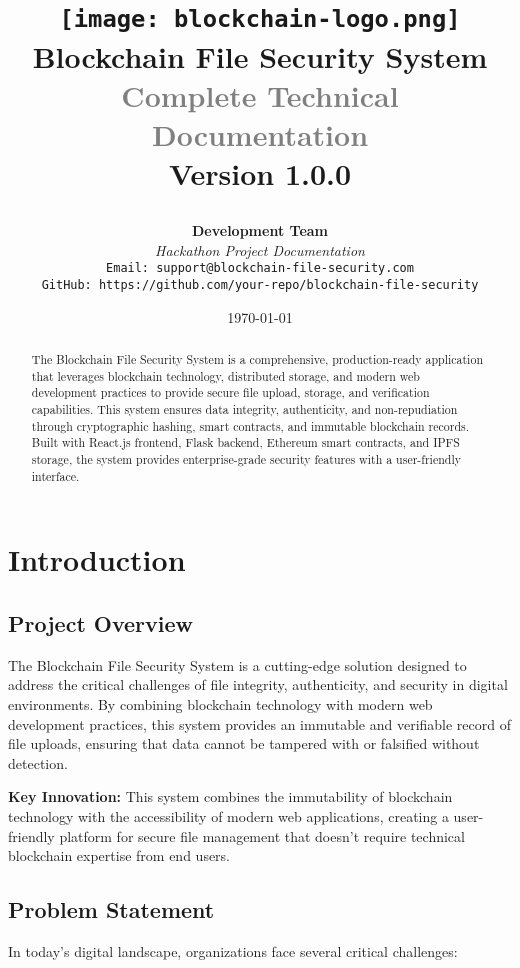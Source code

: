 \documentclass[11pt,a4paper]{article}
\title{
    \vspace{-2cm}
    \begin{center}
        \texttt{[image: blockchain-logo.png]}\\[1em]
        {\Huge\textbf{\textcolor{primaryblue}{Blockchain File Security System}}}\\[0.5em]
        {\Large\textcolor{gray}{Complete Technical Documentation}}\\[1em]
        {\large Version 1.0.0}
    \end{center}
}
\author{
    \textbf{Development Team}\\
    \textit{Hackathon Project Documentation}\\[1em]
    \texttt{Email: support@blockchain-file-security.com}\\
    \texttt{GitHub: https://github.com/your-repo/blockchain-file-security}
}
\date{\today}
\begin{document}
\maketitle
\thispagestyle{empty}

\begin{abstract}
The Blockchain File Security System is a comprehensive, production-ready application that leverages blockchain technology, distributed storage, and modern web development practices to provide secure file upload, storage, and verification capabilities. This system ensures data integrity, authenticity, and non-repudiation through cryptographic hashing, smart contracts, and immutable blockchain records. Built with React.js frontend, Flask backend, Ethereum smart contracts, and IPFS storage, the system provides enterprise-grade security features with a user-friendly interface.
\end{abstract}

\newpage
\tableofcontents
\newpage

\section{Introduction}

\subsection{Project Overview}
The Blockchain File Security System is a cutting-edge solution designed to address the critical challenges of file integrity, authenticity, and security in digital environments. By combining blockchain technology with modern web development practices, this system provides an immutable and verifiable record of file uploads, ensuring that data cannot be tampered with or falsified without detection.

\begin{infobox}
\textbf{Key Innovation:} This system combines the immutability of blockchain technology with the accessibility of modern web applications, creating a user-friendly platform for secure file management that doesn't require technical blockchain expertise from end users.
\end{infobox}

\subsection{Problem Statement}
In today's digital landscape, organizations face several critical challenges:
\end{document}
